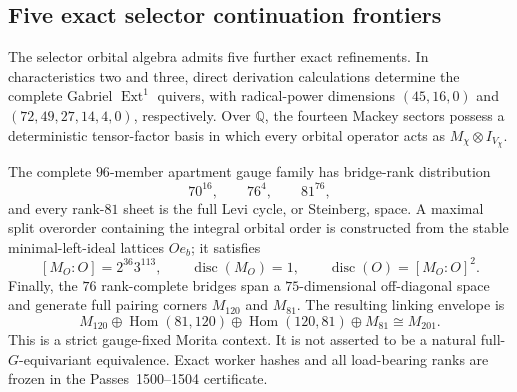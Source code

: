 \subsection{Five exact selector continuation frontiers}\label{sec:pass1500-1504}
The selector orbital algebra admits five further exact refinements.  In characteristics two and three, direct derivation calculations determine the complete Gabriel $\operatorname{Ext}^1$ quivers, with radical-power dimensions $(45,16,0)$ and $(72,49,27,14,4,0)$, respectively.  Over $\mathbb Q$, the fourteen Mackey sectors possess a deterministic tensor-factor basis in which every orbital operator acts as $M_\chi\otimes I_{V_\chi}$.

The complete $96$-member apartment gauge family has bridge-rank distribution
\[
70^{16},\qquad 76^4,\qquad 81^{76},
\]
and every rank-$81$ sheet is the full Levi cycle, or Steinberg, space.  A maximal split overorder containing the integral orbital order is constructed from the stable minimal-left-ideal lattices $Oe_b$; it satisfies
\[
[M_O:O]=2^{36}3^{113},\qquad \operatorname{disc}(M_O)=1,
\qquad \operatorname{disc}(O)=[M_O:O]^2.
\]
Finally, the $76$ rank-complete bridges span a $75$-dimensional off-diagonal space and generate full pairing corners $M_{120}$ and $M_{81}$.  The resulting linking envelope is
\[
M_{120}\oplus \operatorname{Hom}(81,120)\oplus
\operatorname{Hom}(120,81)\oplus M_{81}\cong M_{201}.
\]
This is a strict gauge-fixed Morita context.  It is not asserted to be a natural full-$G$-equivariant equivalence.  Exact worker hashes and all load-bearing ranks are frozen in the Passes~1500--1504 certificate.
